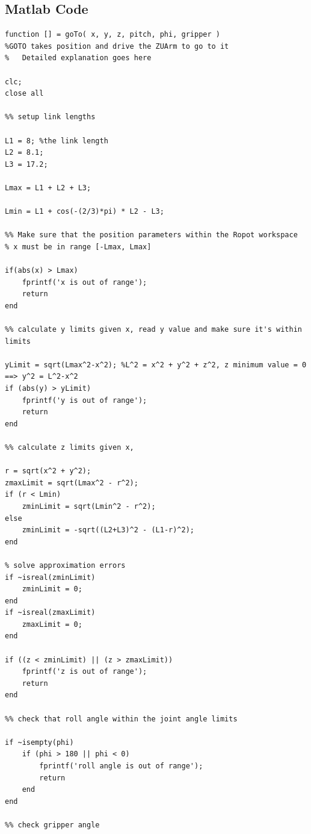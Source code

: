 \documentclass[11pt,a4paper]{report}
\begin{document}
\subsection{Matlab Code}
\label{appendix:matlab}
\begin{lstlisting}
function [] = goTo( x, y, z, pitch, phi, gripper )
%GOTO takes position and drive the ZUArm to go to it
%   Detailed explanation goes here

clc; 
close all

%% setup link lengths

L1 = 8; %the link length
L2 = 8.1; 
L3 = 17.2; 

Lmax = L1 + L2 + L3;

Lmin = L1 + cos(-(2/3)*pi) * L2 - L3;

%% Make sure that the position parameters within the Ropot workspace
% x must be in range [-Lmax, Lmax]

if(abs(x) > Lmax)
    fprintf('x is out of range');
    return
end

%% calculate y limits given x, read y value and make sure it's within limits

yLimit = sqrt(Lmax^2-x^2); %L^2 = x^2 + y^2 + z^2, z minimum value = 0 ==> y^2 = L^2-x^2
if (abs(y) > yLimit)
    fprintf('y is out of range');
    return
end

%% calculate z limits given x,

r = sqrt(x^2 + y^2);
zmaxLimit = sqrt(Lmax^2 - r^2);
if (r < Lmin)
    zminLimit = sqrt(Lmin^2 - r^2);
else
    zminLimit = -sqrt((L2+L3)^2 - (L1-r)^2);
end
    
% solve approximation errors
if ~isreal(zminLimit)
    zminLimit = 0;
end
if ~isreal(zmaxLimit)
    zmaxLimit = 0;
end
    
if ((z < zminLimit) || (z > zmaxLimit))
    fprintf('z is out of range');
    return
end

%% check that roll angle within the joint angle limits

if ~isempty(phi)
    if (phi > 180 || phi < 0)
        fprintf('roll angle is out of range');
        return
    end
end

%% check gripper angle


\end{lstlisting}
\end{document}
